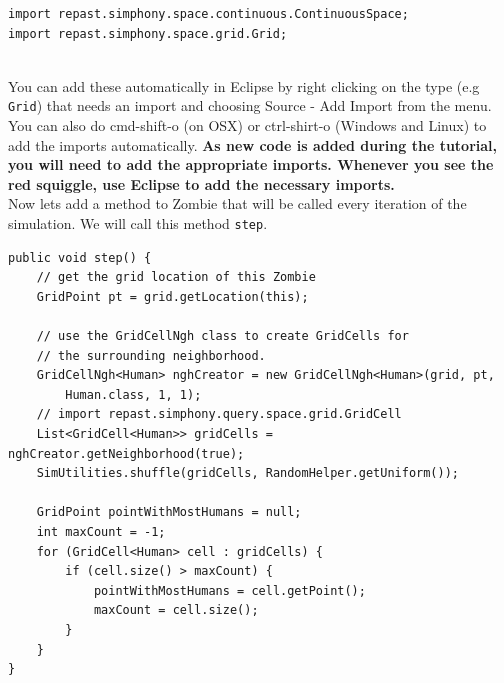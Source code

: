 \documentclass[11pt]{amsart}
\begin{document}
\noindent\begin{minipage}[h]{\textwidth}
\vspace{.2in}
\lstset{language=java,caption=Zombie Imports}
\begin{lstlisting}
import repast.simphony.space.continuous.ContinuousSpace;
import repast.simphony.space.grid.Grid;
  
\end{lstlisting}
\vspace{.2in}
\end{minipage}
You can add these automatically in Eclipse by right clicking on the type (e.g  \texttt{Grid}) that needs an import and choosing Source - Add Import from the menu. You can also do cmd-shift-o (on OSX) or ctrl-shirt-o (Windows and Linux) to add the imports automatically. \textbf{As new code is added during the tutorial, you will need to add the appropriate imports. Whenever you see the red squiggle, use Eclipse to add the necessary imports.}\\


Now lets add a method to Zombie that will be called every iteration of the simulation. We will call this method \texttt{step}.

\noindent\begin{minipage}[h]{\textwidth}
\vspace{.2in}
\lstset{language=java,caption=step Method}
\begin{lstlisting}
public void step() {
	// get the grid location of this Zombie
	GridPoint pt = grid.getLocation(this);
	
	// use the GridCellNgh class to create GridCells for 
	// the surrounding neighborhood.
	GridCellNgh<Human> nghCreator = new GridCellNgh<Human>(grid, pt, 
		Human.class, 1, 1);
	// import repast.simphony.query.space.grid.GridCell
	List<GridCell<Human>> gridCells = nghCreator.getNeighborhood(true);
	SimUtilities.shuffle(gridCells, RandomHelper.getUniform());
	
	GridPoint pointWithMostHumans = null;
	int maxCount = -1;
	for (GridCell<Human> cell : gridCells) {
		if (cell.size() > maxCount) {
			pointWithMostHumans = cell.getPoint();
			maxCount = cell.size();
		}
	}
}
\end{lstlisting}
\vspace{.2in}
\end{minipage}
\end{document}

